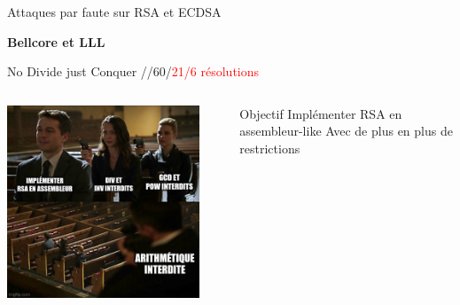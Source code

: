 \begin{frame}{Attaques par faute sur RSA et ECDSA}
    \large{\centerline{\textbf{Bellcore et LLL}}}
\end{frame}

\begin{frame}{No Divide just Conquer \FiveStar/\FiveStar\FiveStar/\FiveStar\FiveStar\FiveStar \hfill 60/\textcolor{red}{21/6 résolutions}}
    \begin{columns}[c]
        \begin{center}                  
            \includegraphics[width=0.9\textwidth]{img/meme/rsa-intro.png}
        \end{center}

           \begin{outline}
               \1 Objectif
                \2 Implémenter RSA en assembleur-like
                \2 Avec de plus en plus de restrictions
           \end{outline}
    \end{columns}
\end{frame}

